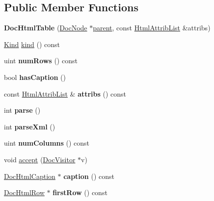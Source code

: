 \subsection*{Public Member Functions}
\begin{DoxyCompactItemize}
\item 
\mbox{\label{class_doc_html_table_a554bdfa1b4ef47b984a15192accd9121}} 
{\bfseries Doc\+Html\+Table} (\mbox{\hyperlink{class_doc_node}{Doc\+Node}} $\ast$\mbox{\hyperlink{class_doc_node_a73e8ad29a91cfceb0968eb00db71a23d}{parent}}, const \mbox{\hyperlink{class_html_attrib_list}{Html\+Attrib\+List}} \&attribs)
\item 
\mbox{\hyperlink{class_doc_node_aebd16e89ca590d84cbd40543ea5faadb}{Kind}} \mbox{\hyperlink{class_doc_html_table_affb4a9eac5912bbb97720e9f320d5875}{kind}} () const
\item 
\mbox{\label{class_doc_html_table_aad31d53a3fa7659d56062f913316fe07}} 
uint {\bfseries num\+Rows} () const
\item 
\mbox{\label{class_doc_html_table_a4381899d937402a0c96179b3e54398fa}} 
bool {\bfseries has\+Caption} ()
\item 
\mbox{\label{class_doc_html_table_a1298564e7844015c7be73d46826a7430}} 
const \mbox{\hyperlink{class_html_attrib_list}{Html\+Attrib\+List}} \& {\bfseries attribs} () const
\item 
\mbox{\label{class_doc_html_table_aa8201d7a0646b92c2c590b83e24f59fb}} 
int {\bfseries parse} ()
\item 
\mbox{\label{class_doc_html_table_a88a5c329482d1daa237a23da1821f72a}} 
int {\bfseries parse\+Xml} ()
\item 
\mbox{\label{class_doc_html_table_a43a629cf3090a180461a7050a888d98c}} 
uint {\bfseries num\+Columns} () const
\item 
void \mbox{\hyperlink{class_doc_html_table_a800ecff89a18489af2a256c1a984e60a}{accept}} (\mbox{\hyperlink{class_doc_visitor}{Doc\+Visitor}} $\ast$v)
\item 
\mbox{\label{class_doc_html_table_a00268018fdac28ae9f75f7ac75c87f7b}} 
\mbox{\hyperlink{class_doc_html_caption}{Doc\+Html\+Caption}} $\ast$ {\bfseries caption} () const
\item 
\mbox{\label{class_doc_html_table_a5a23ad4deb55ba5dfbffb1b72f827f1a}} 
\mbox{\hyperlink{class_doc_html_row}{Doc\+Html\+Row}} $\ast$ {\bfseries first\+Row} () const
\end{DoxyCompactItemize}
